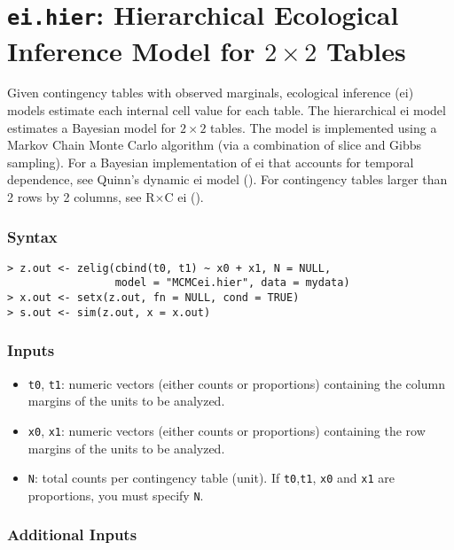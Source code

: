 \section{\texttt{ei.hier}: Hierarchical Ecological Inference Model for
$2 \times 2$ Tables} 

\label{ei.hier}

Given contingency tables with observed marginals, ecological inference
({\sc ei}) models estimate each internal cell value for each table.
The hierarchical {\sc ei} model estimates a Bayesian model for $2
\times 2$ tables.  The model is implemented using a Markov Chain Monte
Carlo algorithm (via a combination of slice and Gibbs sampling).  
For a Bayesian implementation of {\sc ei} that accounts for temporal
dependence, see Quinn's dynamic {\sc ei} model ().
For contingency tables larger than
2 rows by 2 columns, see R$\times$C {\sc ei} (). 

\subsubsection{Syntax}
\begin{verbatim}
> z.out <- zelig(cbind(t0, t1) ~ x0 + x1, N = NULL, 
                 model = "MCMCei.hier", data = mydata)
> x.out <- setx(z.out, fn = NULL, cond = TRUE)
> s.out <- sim(z.out, x = x.out)
\end{verbatim}

\subsubsection{Inputs}

\begin{itemize}
\item \texttt{t0}, {\tt t1}: numeric vectors (either counts or
proportions) containing the column margins of the units to be
analyzed.

\item \texttt{x0}, {\tt x1}: numeric vectors (either counts or
proportions) containing the row margins of the units to be
analyzed.

\item \texttt{N}: total counts per contingency table (unit).  If
\texttt{t0},\texttt{t1}, \texttt{x0} and \texttt{x1} are proportions,
you must specify \texttt{N}. 

\end{itemize}

\subsubsection{Additional Inputs}

